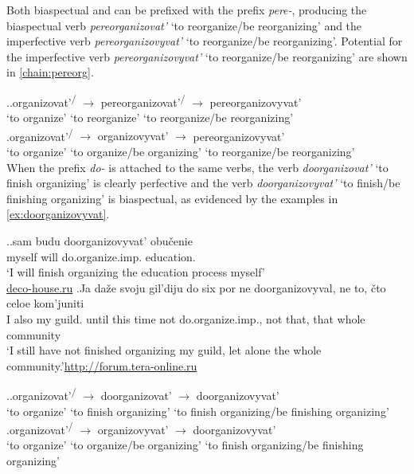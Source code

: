 Both biaspectual and  can be prefixed with the  prefix \textit{pere-}, producing the biaspectual verb \textit{pereorganizovat'} `to reorganize/be reorganizing' and the imperfective verb \textit{pereorganizovyvat'} `to reorganize/be reorganizing'. Potential  for the imperfective verb \textit{pereorganizovyvat'} `to reorganize/be reorganizing' are shown in \ref{chain:pereorg}. 

\ex.\label{chain:pereorg}\ag.organizovat'\textsuperscript{\PF\slash\IPF} {$\rightarrow$} {pereorganizovat'\textsuperscript{\PF\slash\IPF}} {$\rightarrow$} pereorganizovyvat'\textsuperscript{\IPF}\\
{`to organize'} {} {`to reorganize'} {} {`to reorganize/be reorganizing'}\\
\bg.organizovat'\textsuperscript{\PF\slash\IPF} {$\rightarrow$} {organizovyvat'\textsuperscript{\IPF}} {$\rightarrow$} pereorganizovyvat'\textsuperscript{\IPF}\\
{`to organize'} {} {`to organize/be organizing'} {} {`to reorganize/be reorganizing'}\\

When the  prefix \textit{do-} is attached to the same verbs, the verb \textit{doorganizovat'} `to finish organizing' is clearly perfective and the verb \textit{doorganizovyvat'} `to finish/be finishing organizing' is biaspectual, as evidenced by the examples in \ref{ex:doorganizovyvat}.

\ex.\label{ex:doorganizovyvat}\ag.sam budu doorganizovyvat'\textsuperscript{\IPF} obu\v{c}enie\\
myself will do.organize.imp. education.\\
\trans `I will finish organizing the education process myself'\\\hbox{}\hfill\hbox{\url{deco-house.ru}}
\bg.Ja da\v{z}e svoju gil'diju do six por ne doorganizovyval\textsuperscript{\PF}, ne to, \v{c}to celoe kom'juniti\\
I also my guild. until this time not do.organize.imp., not that, that whole community\\
\trans `I still have not finished organizing my guild, let alone the whole community.'\hbox{}\hfill\hbox{\url{http://forum.tera-online.ru}}

\ex.\label{chain:doorg}\ag.organizovat'\textsuperscript{\PF\slash\IPF} {$\rightarrow$} {doorganizovat'\textsuperscript{\PF}} {$\rightarrow$} doorganizovyvat'\textsuperscript{\IPF}\\
{`to organize'} {} {`to finish organizing'} {} {`to finish organizing/be finishing organizing'}\\
\bg.organizovat'\textsuperscript{\PF\slash\IPF} {$\rightarrow$} {organizovyvat'\textsuperscript{\IPF}} {$\rightarrow$} doorganizovyvat'\textsuperscript{\PF}\\
{`to organize'} {} {`to organize/be organizing'} {} {`to finish organizing/be finishing organizing'}\\

